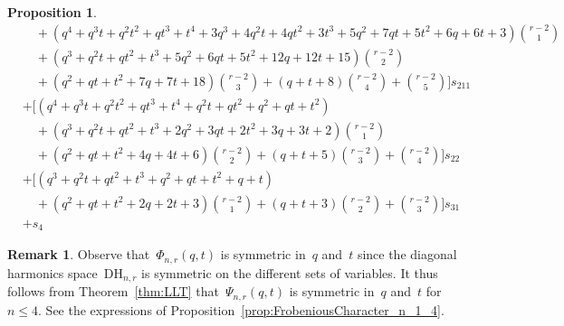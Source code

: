 \documentclass{amsart}
\newtheorem{proposition}[theorem]{Proposition}
\theoremstyle{definition}
\newtheorem{remark}[theorem]{Remark}
\newcommand{\DiagHarm}[2]{\mathrm{DH}_{#1,#2}} %
\begin{document}
\begin{proposition}
\begin{align*}
& \textstyle \quad + ({\scriptstyle q^{4} + q^{3} t + q^{2} t^{2} + q t^{3} + t^{4} + 3q^{3} + 4q^{2} t + 4q t^{2} + 3t^{3} + 5q^{2} + 7q t + 5t^{2} + 6q + 6t + 3}) {r - 2 \choose 1} \\[-.1cm]
& \textstyle \quad + ({\scriptstyle q^{3} + q^{2} t + q t^{2} + t^{3} + 5q^{2} + 6q t + 5t^{2} + 12q + 12t + 15}) {r - 2 \choose 2} \\[-.1cm]
& \textstyle \quad + ({\scriptstyle q^{2} + q t + t^{2} + 7q + 7t + 18}) {r - 2 \choose 3} + ({\scriptstyle q + t + 8}) {r - 2 \choose 4} + {r - 2 \choose 5} \big] s_{211} \\[.1cm]
%
& + \big[ \textstyle ({\scriptstyle q^{4} + q^{3} t + q^{2} t^{2} + q t^{3} + t^{4} + q^{2} t + q t^{2} + q^{2} + q t + t^{2}}) \\[-.1cm]
& \textstyle \quad + ({\scriptstyle q^{3} + q^{2} t + q t^{2} + t^{3} + 2q^{2} + 3q t + 2t^{2} + 3q + 3t + 2}) {r - 2 \choose 1} \\[-.1cm]
& \textstyle \quad + ({\scriptstyle q^{2} + q t + t^{2} + 4q + 4t + 6}) {r - 2 \choose 2} + ({\scriptstyle q + t + 5}) {r - 2 \choose 3} + {r - 2 \choose 4} \big] s_{22} \\[.1cm]
%
& + \big[ \textstyle ({\scriptstyle q^{3} + q^{2} t + q t^{2} + t^{3} + q^{2} + q t + t^{2} + q + t}) \\[-.1cm]
& \textstyle \quad + ({\scriptstyle q^{2} + q t + t^{2} + 2q + 2t + 3}) {r - 2 \choose 1} + ({\scriptstyle q + t + 3}) {r - 2 \choose 2} + {r - 2 \choose 3} \big] s_{31} \\[.1cm]
%
& + s_4
\end{align*}
\end{proposition}

\begin{remark}
\label{rem:qtsymmetry}
Observe that~$\Phi_{n,r}(q,t)$ is symmetric in~$q$ and~$t$ since the diagonal harmonics space~$\DiagHarm{n}{r}$ is symmetric on the different sets of variables.
It thus follows from Theorem~\ref{thm:LLT} that~$\Psi_{n,r}(q,t)$ is symmetric in~$q$ and~$t$ for~$n \le 4$. See the expressions of Proposition~\ref{prop:FrobeniousCharacter_n_1_4}.
\end{remark}
\end{document}
